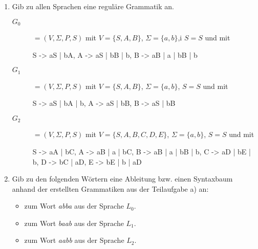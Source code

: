 \documentclass{lehramt-informatik-aufgabe}
\begin{document}
\begin{enumerate}


\item Gib zu allen Sprachen eine reguläre Grammatik an.

\begin{liAntwort}

\begin{description}
%

\item[$G_0$]

$= (V, \Sigma, P, S)$ mit
$V = \{S, A, B\}$,
$\Sigma = \{a, b\}$,i
$S = S$ und mit

\begin{liProduktionsRegeln}
S -> aS | bA,
A -> aS | bB | b,
B -> aB | a | bB | b
\end{liProduktionsRegeln}

%

\item[$G_1$]

$= (V, \Sigma, P, S)$ mit
$V = \{S, A, B\}$,
$\Sigma = \{a, b\}$,
$S = S$ und mit

\begin{liProduktionsRegeln}
S -> aS | bA | b,
A -> aS | bB,
B -> aS | bB
\end{liProduktionsRegeln}

%

\item[$G_2$]

$= (V, \Sigma, P, S)$ mit
$V = \{S, A, B, C, D, E\}$,
$\Sigma = \{a, b\}$, $S = S$ und mit

\begin{liProduktionsRegeln}
S -> aA | bC,
A -> aB | a | bC,
B -> aB | a | bB | b,
C -> aD | bE | b,
D -> bC | aD,
E -> bE | b | aD
\end{liProduktionsRegeln}

\end{description}
\end{liAntwort}


\item Gib zu den folgenden Wörtern eine Ableitung bzw. einen Syntaxbaum
anhand der erstellten Grammatiken aus der Teilaufgabe a) an:

\begin{itemize}
\item zum Wort \emph{abba} aus der Sprache $L_0$.
\item zum Wort \emph{baab} aus der Sprache $L_1$.
\item zum Wort \emph{aabb} aus der Sprache $L_2$.
\end{itemize}


\end{enumerate}
\end{document}
